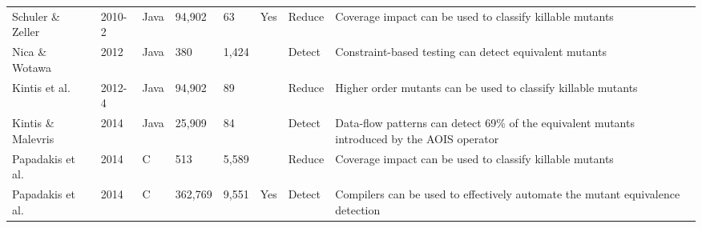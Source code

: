 \begin{table*}[ht]
\begin{tabular}{lllllllp{4cm}}
Schuler \& Zeller \cite{schuler2010covering,schuler2013covering} & 2010-2 & Java     & 94,902                                                     & 63                                                       & Yes                                                       & Reduce                                                   & Coverage impact can be used to classify killable mutants                                      \\
Nica \& Wotawa \cite{nica2012using}    & 2012   & Java     & 380                                                       & 1,424                                                     &                                                           & Detect                                                   & Constraint-based testing can detect equivalent mutants                                        \\
Kintis et al. \cite{kintis2012isolating,kintis2015employing}     & 2012-4 & Java     & 94,902                                                     & 89                                                       &                                                           & Reduce                                                   & Higher order mutants can be used to classify killable mutants                                 \\
Kintis \& Malevris \cite{kintis2014using} & 2014   & Java     & 25,909                                                     & 84                                                       &                                                           & Detect                                                   & Data-flow patterns can detect 69\% of the equivalent mutants introduced by the AOIS operator  \\
Papadakis et al. \cite{papadakis2014mitigating}    & 2014   & C        & 513                                                       & 5,589                                                     &                                                           & Reduce                                                   & Coverage impact can be used to classify killable mutants                                      \\
Papadakis et al. \cite{papadakis2015trivial}    & 2014   & C        & 362,769                                                    & 9,551                                                     & Yes                                                       & Detect                                                   & Compilers can be used to effectively automate the mutant equivalence detection               \\
\bottomrule
\end{tabular}
\end{table*}


